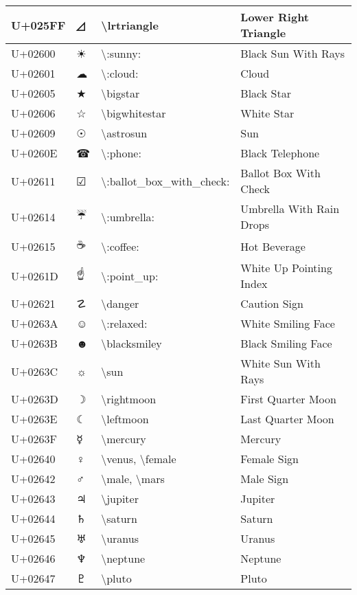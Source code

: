 \begin{table}[h]
\begin{tabulary}{\linewidth}{|L|L|L|L|}
\hline
U+025FF & ◿ & {\textbackslash}lrtriangle & Lower Right Triangle \\
\hline
U+02600 & ☀ & {\textbackslash}:sunny: & Black Sun With Rays \\
\hline
U+02601 & ☁ & {\textbackslash}:cloud: & Cloud \\
\hline
U+02605 & ★ & {\textbackslash}bigstar & Black Star \\
\hline
U+02606 & ☆ & {\textbackslash}bigwhitestar & White Star \\
\hline
U+02609 & ☉ & {\textbackslash}astrosun & Sun \\
\hline
U+0260E & ☎ & {\textbackslash}:phone: & Black Telephone \\
\hline
U+02611 & ☑ & {\textbackslash}:ballot\_box\_with\_check: & Ballot Box With Check \\
\hline
U+02614 & ☔ & {\textbackslash}:umbrella: & Umbrella With Rain Drops \\
\hline
U+02615 & ☕ & {\textbackslash}:coffee: & Hot Beverage \\
\hline
U+0261D & ☝ & {\textbackslash}:point\_up: & White Up Pointing Index \\
\hline
U+02621 & ☡ & {\textbackslash}danger & Caution Sign \\
\hline
U+0263A & ☺ & {\textbackslash}:relaxed: & White Smiling Face \\
\hline
U+0263B & ☻ & {\textbackslash}blacksmiley & Black Smiling Face \\
\hline
U+0263C & ☼ & {\textbackslash}sun & White Sun With Rays \\
\hline
U+0263D & ☽ & {\textbackslash}rightmoon & First Quarter Moon \\
\hline
U+0263E & ☾ & {\textbackslash}leftmoon & Last Quarter Moon \\
\hline
U+0263F & ☿ & {\textbackslash}mercury & Mercury \\
\hline
U+02640 & ♀ & {\textbackslash}venus, {\textbackslash}female & Female Sign \\
\hline
U+02642 & ♂ & {\textbackslash}male, {\textbackslash}mars & Male Sign \\
\hline
U+02643 & ♃ & {\textbackslash}jupiter & Jupiter \\
\hline
U+02644 & ♄ & {\textbackslash}saturn & Saturn \\
\hline
U+02645 & ♅ & {\textbackslash}uranus & Uranus \\
\hline
U+02646 & ♆ & {\textbackslash}neptune & Neptune \\
\hline
U+02647 & ♇ & {\textbackslash}pluto & Pluto \\

\end{tabulary}
\end{table}
